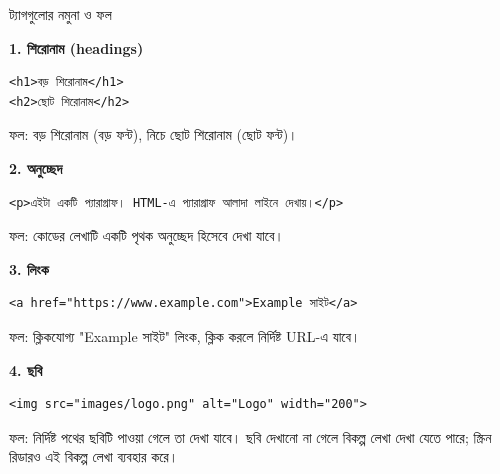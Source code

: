 \begin{examplebox}{ট্যাগগুলোর নমুনা ও ফল}
\par\noindent\textbf{1. শিরোনাম (headings)}\par
\begin{minipage}[t]{.50\linewidth}\vspace{0pt}
\begin{chFourBanglaCode}
\begin{verbatim}
<h1>বড় শিরোনাম</h1>
<h2>ছোট শিরোনাম</h2>
\end{verbatim}
\end{chFourBanglaCode}
\end{minipage}\hfill
\begin{minipage}[t]{.46\linewidth}\vspace{0pt}
ফল: বড় শিরোনাম (বড় ফন্ট), নিচে ছোট শিরোনাম (ছোট ফন্ট)।
\end{minipage}



\vspace{6pt}
\par\noindent\begin{minipage}{\linewidth}
\textbf{2. অনুচ্ছেদ}\\
\begin{chFourBanglaCode}
\begin{verbatim}
<p>এইটা একটি প্যারাগ্রাফ। HTML-এ প্যারাগ্রাফ আলাদা লাইনে দেখায়।</p>
\end{verbatim}
\end{chFourBanglaCode}
ফল: কোডের লেখাটি একটি পৃথক অনুচ্ছেদ হিসেবে দেখা যাবে।
\end{minipage}\par

\vspace{6pt}
\par\noindent\begin{minipage}{\linewidth}
\textbf{3. লিংক}\\
\begin{chFourBanglaCode}
\begin{verbatim}
<a href="https://www.example.com">Example সাইট</a>
\end{verbatim}
\end{chFourBanglaCode}
ফল: ক্লিকযোগ্য "Example সাইট" লিংক, ক্লিক করলে নির্দিষ্ট URL-এ যাবে।
\end{minipage}\par

\vspace{6pt}
\par\noindent\begin{minipage}{\linewidth}
\textbf{4. ছবি}\\
\begin{verbatim}
<img src="images/logo.png" alt="Logo" width="200">
\end{verbatim}
ফল: নির্দিষ্ট পথের ছবিটি পাওয়া গেলে তা দেখা যাবে। ছবি দেখানো না গেলে বিকল্প লেখা দেখা যেতে পারে; স্ক্রিন রিডারও এই বিকল্প লেখা ব্যবহার করে।
\end{minipage}\par


\end{examplebox}
